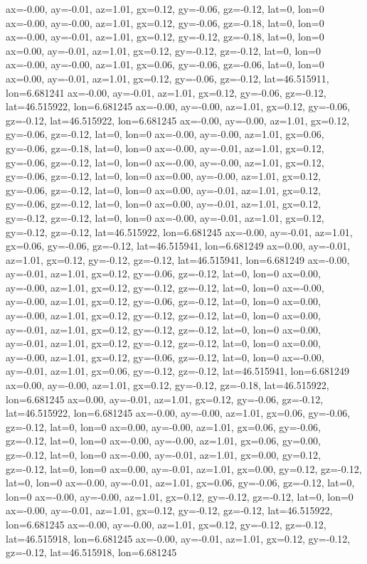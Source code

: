 ax=-0.00, ay=-0.01, az=1.01, gx=0.12, gy=-0.06, gz=-0.12, lat=0, lon=0
ax=-0.00, ay=-0.00, az=1.01, gx=0.12, gy=-0.06, gz=-0.18, lat=0, lon=0
ax=-0.00, ay=-0.01, az=1.01, gx=0.12, gy=-0.12, gz=-0.18, lat=0, lon=0
ax=0.00, ay=-0.01, az=1.01, gx=0.12, gy=-0.12, gz=-0.12, lat=0, lon=0
ax=-0.00, ay=-0.00, az=1.01, gx=0.06, gy=-0.06, gz=-0.06, lat=0, lon=0
ax=0.00, ay=-0.01, az=1.01, gx=0.12, gy=-0.06, gz=-0.12, lat=46.515911, lon=6.681241
ax=-0.00, ay=-0.01, az=1.01, gx=0.12, gy=-0.06, gz=-0.12, lat=46.515922, lon=6.681245
ax=-0.00, ay=-0.00, az=1.01, gx=0.12, gy=-0.06, gz=-0.12, lat=46.515922, lon=6.681245
ax=-0.00, ay=-0.00, az=1.01, gx=0.12, gy=-0.06, gz=-0.12, lat=0, lon=0
ax=-0.00, ay=-0.00, az=1.01, gx=0.06, gy=-0.06, gz=-0.18, lat=0, lon=0
ax=-0.00, ay=-0.01, az=1.01, gx=0.12, gy=-0.06, gz=-0.12, lat=0, lon=0
ax=-0.00, ay=-0.00, az=1.01, gx=0.12, gy=-0.06, gz=-0.12, lat=0, lon=0
ax=0.00, ay=-0.00, az=1.01, gx=0.12, gy=-0.06, gz=-0.12, lat=0, lon=0
ax=0.00, ay=-0.01, az=1.01, gx=0.12, gy=-0.06, gz=-0.12, lat=0, lon=0
ax=0.00, ay=-0.01, az=1.01, gx=0.12, gy=-0.12, gz=-0.12, lat=0, lon=0
ax=-0.00, ay=-0.01, az=1.01, gx=0.12, gy=-0.12, gz=-0.12, lat=46.515922, lon=6.681245
ax=-0.00, ay=-0.01, az=1.01, gx=0.06, gy=-0.06, gz=-0.12, lat=46.515941, lon=6.681249
ax=0.00, ay=-0.01, az=1.01, gx=0.12, gy=-0.12, gz=-0.12, lat=46.515941, lon=6.681249
ax=-0.00, ay=-0.01, az=1.01, gx=0.12, gy=-0.06, gz=-0.12, lat=0, lon=0
ax=0.00, ay=-0.00, az=1.01, gx=0.12, gy=-0.12, gz=-0.12, lat=0, lon=0
ax=-0.00, ay=-0.00, az=1.01, gx=0.12, gy=-0.06, gz=-0.12, lat=0, lon=0
ax=0.00, ay=-0.00, az=1.01, gx=0.12, gy=-0.12, gz=-0.12, lat=0, lon=0
ax=0.00, ay=-0.01, az=1.01, gx=0.12, gy=-0.12, gz=-0.12, lat=0, lon=0
ax=0.00, ay=-0.01, az=1.01, gx=0.12, gy=-0.12, gz=-0.12, lat=0, lon=0
ax=0.00, ay=-0.00, az=1.01, gx=0.12, gy=-0.06, gz=-0.12, lat=0, lon=0
ax=-0.00, ay=-0.01, az=1.01, gx=0.06, gy=-0.12, gz=-0.12, lat=46.515941, lon=6.681249
ax=0.00, ay=-0.00, az=1.01, gx=0.12, gy=-0.12, gz=-0.18, lat=46.515922, lon=6.681245
ax=0.00, ay=-0.01, az=1.01, gx=0.12, gy=-0.06, gz=-0.12, lat=46.515922, lon=6.681245
ax=-0.00, ay=-0.00, az=1.01, gx=0.06, gy=-0.06, gz=-0.12, lat=0, lon=0
ax=0.00, ay=-0.00, az=1.01, gx=0.06, gy=-0.06, gz=-0.12, lat=0, lon=0
ax=-0.00, ay=-0.00, az=1.01, gx=0.06, gy=0.00, gz=-0.12, lat=0, lon=0
ax=-0.00, ay=-0.01, az=1.01, gx=0.00, gy=0.12, gz=-0.12, lat=0, lon=0
ax=0.00, ay=-0.01, az=1.01, gx=0.00, gy=0.12, gz=-0.12, lat=0, lon=0
ax=-0.00, ay=-0.01, az=1.01, gx=0.06, gy=-0.06, gz=-0.12, lat=0, lon=0
ax=-0.00, ay=-0.00, az=1.01, gx=0.12, gy=-0.12, gz=-0.12, lat=0, lon=0
ax=-0.00, ay=-0.01, az=1.01, gx=0.12, gy=-0.12, gz=-0.12, lat=46.515922, lon=6.681245
ax=-0.00, ay=-0.00, az=1.01, gx=0.12, gy=-0.12, gz=-0.12, lat=46.515918, lon=6.681245
ax=-0.00, ay=-0.01, az=1.01, gx=0.12, gy=-0.12, gz=-0.12, lat=46.515918, lon=6.681245